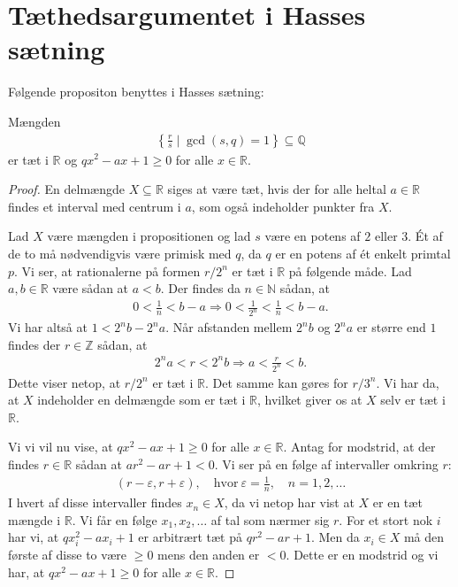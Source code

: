 \section{Tæthedsargumentet i Hasses sætning}
Følgende propositon benyttes i Hasses sætning: 
\begin{proposition}
\label{appendiks_dense}
Mængden 
\begin{align*}
	\left\{ \frac{r}{s} \mid \gcd(s, q) = 1 \right\} \subseteq \mathbb{Q}
\end{align*}
er tæt i $\mathbb{R}$ og $qx^2 - ax + 1 \geq 0$ for alle $x \in \mathbb{R}$.
\end{proposition}
\begin{proof}
En delmængde $X \subseteq \mathbb{R}$ siges at være tæt, hvis der for alle heltal $a \in \mathbb{R}$ findes et interval med centrum i $a$, som også indeholder punkter fra $X$. 

Lad $X$ være mængden i propositionen og lad $s$ være en potens af $2$ eller $3$. Ét af de to må nødvendigvis være primisk med $q$, da $q$ er en potens af ét enkelt primtal $p$. Vi ser, at rationalerne på formen $r/2^n$ er tæt i $\mathbb{R}$ på følgende måde. Lad $a, b \in \mathbb{R}$ være sådan at $a < b$. Der findes da $n \in \mathbb{N}$ sådan, at 
\begin{align*}
	0 < \frac{1}{n} < b - a \Rightarrow 0 < \frac{1}{2^n} < \frac{1}{n} < b - a.
\end{align*}
Vi har altså at $1 < 2^n b - 2^n a$. Når afstanden mellem $2^n b$ og $2^n a$ er større end $1$ findes der $r \in \mathbb{Z}$ sådan, at
\begin{align*}
	2^n a < r < 2^n b \Rightarrow a < \frac{r}{2^n} < b.
\end{align*}
Dette viser netop, at $r/2^n$ er tæt i $\mathbb{R}$. Det samme kan gøres for $r/3^n$. Vi har da, at $X$ indeholder en delmængde som er tæt i $\mathbb{R}$, hvilket giver os at $X$ selv er tæt i $\mathbb{R}$.

Vi vi vil nu vise, at $qx^2 - ax + 1 \geq 0$ for alle $x \in \mathbb{R}$.
Antag for modstrid, at der findes $r \in \mathbb{R}$ sådan at $ar^2 -ar + 1 < 0$. Vi ser på en følge af intervaller omkring $r$:
\begin{align*}
	(r - \varepsilon, r + \varepsilon), \quad \text{hvor} \ \varepsilon = \frac{1}{n}, \quad n = 1, 2, \ldots
\end{align*}
I hvert af disse intervaller findes $x_n \in X$, da vi netop har vist at $X$ er en tæt mængde i $\mathbb{R}$. Vi får en følge $x_1, x_2, \ldots$ af tal som nærmer sig $r$. For et stort nok $i$ har vi, at $qx_{i}^{2} -ax_i + 1$ er arbitrært tæt på $qr^2 - ar + 1$. Men da $x_i \in X$ må den første af disse to være $\geq 0$ mens den anden er $< 0$. Dette er en modstrid og vi har, at 
$qx^2 - ax + 1 \geq 0$ for alle $x \in \mathbb{R}$.
\end{proof}

